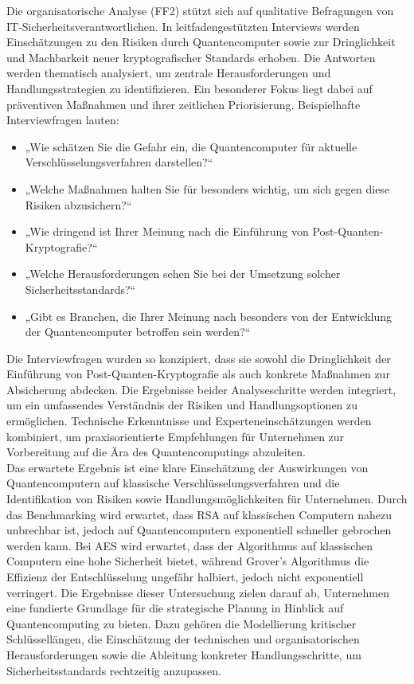 Die organisatorische Analyse (FF2) stützt sich auf qualitative Befragungen von IT-Sicherheitsverantwortlichen. 
In leitfadengestützten Interviews werden Einschätzungen zu den Risiken durch Quantencomputer 
sowie zur Dringlichkeit und Machbarkeit neuer kryptografischer Standards erhoben. Die Antworten werden thematisch 
analysiert, um zentrale Herausforderungen und Handlungsstrategien zu identifizieren. Ein besonderer Fokus liegt dabei 
auf präventiven Maßnahmen und ihrer zeitlichen Priorisierung. Beispielhafte Interviewfragen lauten:

\begin{itemize}
    \item „Wie schätzen Sie die Gefahr ein, die Quantencomputer für aktuelle Verschlüsselungsverfahren darstellen?“
    \item „Welche Maßnahmen halten Sie für besonders wichtig, um sich gegen diese Risiken abzusichern?“
    \item „Wie dringend ist Ihrer Meinung nach die Einführung von Post-Quanten-Kryptografie?“
    \item „Welche Herausforderungen sehen Sie bei der Umsetzung solcher Sicherheitsstandards?“
    \item „Gibt es Branchen, die Ihrer Meinung nach besonders von der Entwicklung der Quantencomputer betroffen sein werden?“
\end{itemize}

Die Interviewfragen wurden so konzipiert, dass sie sowohl die Dringlichkeit der Einführung von Post-Quanten-Kryptografie als auch 
konkrete Maßnahmen zur Absicherung abdecken.
Die Ergebnisse beider Analyseschritte werden integriert, um ein umfassendes Verständnis der Risiken und 
Handlungsoptionen zu ermöglichen. Technische Erkenntnisse und Experteneinschätzungen werden kombiniert, um 
praxisorientierte Empfehlungen für Unternehmen zur Vorbereitung auf die Ära des Quantencomputings abzuleiten.\\

Das erwartete Ergebnis ist eine klare Einschätzung der Auswirkungen von Quantencomputern 
auf klassische Verschlüsselungsverfahren und die Identifikation von Risiken sowie 
Handlungsmöglichkeiten für Unternehmen. Durch das Benchmarking wird erwartet, dass RSA auf klassischen Computern nahezu 
unbrechbar ist, jedoch auf Quantencomputern exponentiell schneller gebrochen werden kann. 
Bei AES wird erwartet, dass der Algorithmus auf klassischen Computern eine hohe Sicherheit bietet, während Grover's Algorithmus die Effizienz 
der Entschlüsselung ungefähr halbiert, jedoch nicht exponentiell verringert.
Die Ergebnisse dieser Untersuchung zielen darauf ab, Unternehmen eine fundierte Grundlage für die strategische Planung in Hinblick auf 
Quantencomputing zu bieten. Dazu gehören die Modellierung kritischer Schlüssellängen, die Einschätzung der technischen und organisatorischen 
Herausforderungen sowie die Ableitung konkreter Handlungsschritte, um Sicherheitsstandards rechtzeitig anzupassen.

